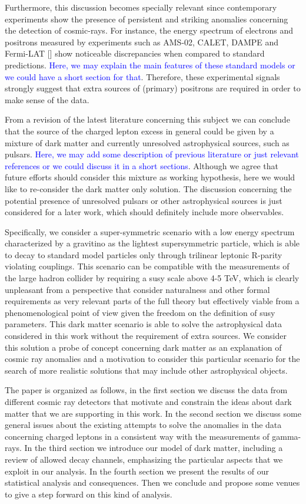 \documentclass[a4paper,11pt]{article}
\newcommand*{\blue}{\textcolor{blue}}
\begin{document}
Furthermore, this discussion becomes specially relevant since contemporary experiments show the presence of persistent and striking anomalies concerning the detection of cosmic-rays. For instance, the energy spectrum of electrons and positrons measured by experiments such as AMS-02, CALET, DAMPE and Fermi-LAT [] show noticeable discrepancies when compared to standard predictions. \blue{Here, we may explain the main features of these standard models or we could have a short section for that}. Therefore, these experimental signals strongly suggest that extra sources of (primary) positrons are required in order to make sense of the data. 

From a revision of the latest literature concerning this subject we can conclude that the source of the charged lepton excess in general could be given by a mixture of dark matter and currently unresolved astrophysical sources, such as pulsars. \blue{Here, we may add some description of previous literature or just relevant references or we could discuss it in a short sections}. Although we agree that future efforts should consider this mixture as working hypothesis, here we would like to re-consider the dark matter only solution. The discussion concerning the potential presence of unresolved pulsars or other astrophysical sources is just considered for a later work, which should definitely include more observables.   

Specifically, we consider a super-symmetric scenario with a low energy spectrum characterized by a gravitino as the lightest supersymmetric particle, which is able to decay to standard model particles only through trilinear leptonic R-parity violating couplings. This scenario can be compatible with the measurements of the large hadron collider by requiring a susy scale above 4-5 TeV, which is clearly unpleasant from a perspective that consider naturalness and other formal requirements as very relevant parts of the full theory but effectively viable from a phenomenological point of view given the freedom on the definition of susy parameters. This dark matter scenario is able to solve the astrophysical data considered in this work without the requirement of extra sources. We consider this solution a probe of concept concerning dark matter as an explanation of cosmic ray anomalies and a motivation to consider this particular scenario for the search of more realistic solutions that may include other astrophysical objects. 

The paper is organized as follows, in the first section we discuss the data from different cosmic ray detectors that motivate and constrain the ideas about dark matter that we are supporting in this work. In the second section we discuss some general issues about the existing attempts
to solve the anomalies in the data concerning charged leptons in a consistent way with the measurements of gamma-rays. In the third section we introduce our model of dark matter, including a review of allowed decay channels, emphasizing the particular aspects that we exploit in our analysis. In the fourth section we present the results of our statistical analysis and consequences. Then we conclude and propose some venues to give a step forward on this kind of analysis.
\end{document}
